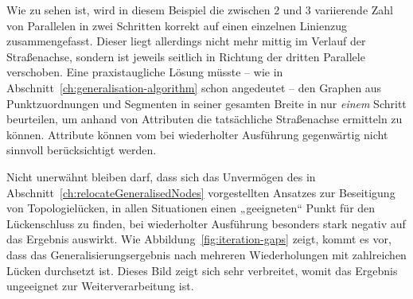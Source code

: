 \documentclass[../main/thesis.tex]{subfiles}
\begin{document}

Wie zu sehen ist, wird in diesem Beispiel die zwischen $2$ und $3$ variierende Zahl von Parallelen in zwei Schritten korrekt auf einen einzelnen Linienzug zusammengefasst.
Dieser liegt allerdings nicht mehr mittig im Verlauf der Straßenachse, sondern ist jeweils seitlich in Richtung der dritten Parallele verschoben.
Eine praxistaugliche Lösung müsste -- wie in Abschnitt~\ref{ch:generalisation-algorithm} schon angedeutet -- den Graphen aus Punktzuordnungen und Segmenten in seiner gesamten Breite in nur \emph{einem} Schritt beurteilen, um anhand von Attributen die tatsächliche Straßenachse ermitteln zu können.
Attribute können vom  bei wiederholter Ausführung gegenwärtig nicht sinnvoll berücksichtigt werden.

Nicht unerwähnt bleiben darf, dass sich das Unvermögen des in Abschnitt~\ref{ch:relocateGeneralisedNodes} vorgestellten Ansatzes zur Beseitigung von Topologielücken, in allen Situationen einen „geeigneten“ Punkt für den Lückenschluss zu finden, bei wiederholter Ausführung besonders stark negativ auf das Ergebnis auswirkt.
Wie Abbildung~\ref{fig:iteration-gaps} zeigt, kommt es vor, dass das Generalisierungsergebnis nach mehreren Wiederholungen mit zahlreichen Lücken durchsetzt ist.
Dieses Bild zeigt sich sehr verbreitet, womit das Ergebnis ungeeignet zur Weiterverarbeitung ist.
\end{document}
